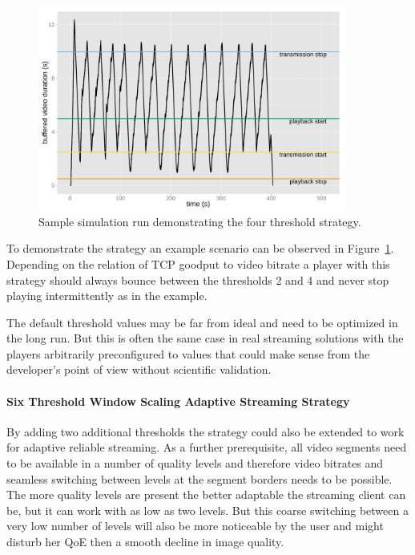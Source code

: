 \begin{figure}[htb]
	\centering
	\includegraphics[width=0.9\textwidth]{images/R-ltesim-plotbuffer-time.pdf}
	\caption{Sample simulation run demonstrating the four threshold strategy.}
\label{c6:fig:ltesim-plotbuffer-time}
\end{figure}

To demonstrate the strategy an example scenario can be observed in Figure~\ref{c6:fig:ltesim-plotbuffer-time}. Depending on the relation of \gls{TCP} goodput to video bitrate a player with this strategy should always bounce between the thresholds 2 and 4 and never stop playing intermittently as in the example.

The default threshold values may be far from ideal and need to be optimized in the long run. But this is often the same case in real streaming solutions with the players arbitrarily preconfigured to values that could make sense from the developer's point of view without scientific validation.


\paragraph{Six Threshold Window Scaling Adaptive Streaming Strategy}

By adding two additional thresholds the strategy could also be extended to work for adaptive reliable streaming. As a further prerequisite, all video segments need to be available in a number of quality levels and therefore video bitrates and seamless switching between levels at the segment borders needs to be possible. The more quality levels are present the better adaptable the streaming client can be, but it can work with as low as two levels. But this coarse switching between a very low number of levels will also be more noticeable by the user and might disturb her \gls{QoE} then a smooth decline in image quality.

